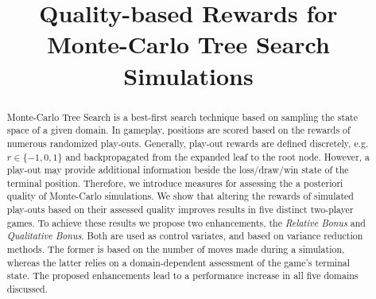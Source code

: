 \documentclass{ecai2014}
\begin{document}
\title{Quality-based Rewards for \\ Monte-Carlo Tree Search Simulations}


\maketitle


\begin{abstract}
Monte-Carlo Tree Search is a best-first search technique based on sampling the state space of a given domain. In gameplay, positions are scored based on the rewards of numerous randomized play-outs. Generally, play-out rewards are defined discretely, e.g. $r \in \{-1, 0, 1\}$ and backpropagated from the expanded leaf to the root node. However, a play-out may provide additional information beside the loss/draw/win state of the terminal position. Therefore, we introduce measures for assessing the a posteriori quality of Monte-Carlo simulations. We show that altering the rewards of simulated play-outs based on their assessed quality improves results in five distinct two-player games. To achieve these results we propose two enhancements, the \emph{Relative Bonus} and \emph{Qualitative Bonus}. Both are used as control variates, and based on variance reduction methods. The former is based on the number of moves made during a simulation, whereas the latter relies on a domain-dependent assessment of the game's terminal state. The proposed enhancements lead to a performance increase in all five domains discussed.
\end{abstract}

\end{document}
